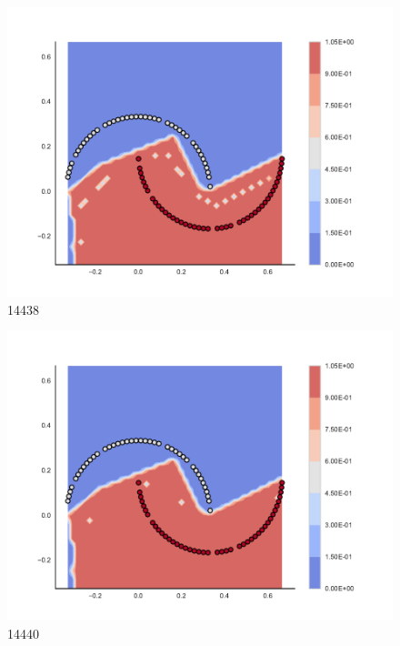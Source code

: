 \begin{subfigure}[b]{0.09\textwidth}
    \includegraphics[clip, trim=2.35cm 1.75cm 4.5cm 0cm,width=\textwidth]{img/convergence/14438.pdf}
    \caption{14438}
    \label{fig:convergence_14438}
\end{subfigure}
%
\begin{subfigure}[b]{0.09\textwidth}
    \includegraphics[clip, trim=2.35cm 1.75cm 4.5cm 0cm,width=\textwidth]{img/convergence/14440.pdf}
    \caption{14440}
    \label{fig:convergence_14440}
\end{subfigure}
%
